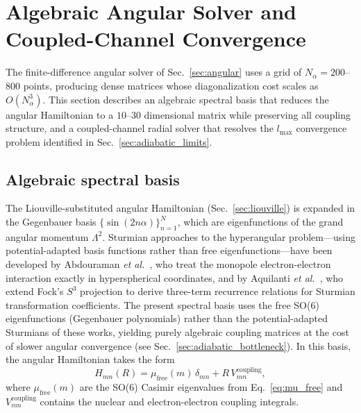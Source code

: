 \documentclass[aps,pra,twocolumn,superscriptaddress,longbibliography]{revtex4-2}
\begin{document}

\section{Algebraic Angular Solver and Coupled-Channel Convergence}
\label{sec:algebraic_angular}

The finite-difference angular solver of Sec.~\ref{sec:angular} uses
a grid of $N_\alpha = 200$--$800$ points, producing dense matrices
whose diagonalization cost scales as $O(N_\alpha^3)$.  This section
describes an algebraic spectral basis that reduces the angular
Hamiltonian to a $10$--$30$ dimensional matrix while preserving
all coupling structure, and a coupled-channel radial solver that
resolves the $l_{\max}$ convergence problem identified in
Sec.~\ref{sec:adiabatic_limits}.

\subsection{Algebraic spectral basis}
\label{sec:spectral_basis}

The Liouville-substituted angular Hamiltonian (Sec.~\ref{sec:liouville})
is expanded in the Gegenbauer basis $\{\sin(2n\alpha)\}_{n=1}^{N}$,
which are eigenfunctions of the grand angular momentum $\Lambda^2$.
Sturmian approaches to the hyperangular problem---using
potential-adapted basis functions rather than free eigenfunctions---have
been developed by Abdouraman \textit{et al.}~\cite{Abdouraman2016},
who treat the monopole electron-electron interaction exactly in
hyperspherical coordinates, and by Aquilanti \textit{et al.}~\cite{Aquilanti2001},
who extend Fock's $S^3$ projection to derive three-term recurrence
relations for Sturmian transformation coefficients.  The present
spectral basis uses the free SO(6) eigenfunctions (Gegenbauer
polynomials) rather than the potential-adapted Sturmians of these
works, yielding purely algebraic coupling matrices at the cost of
slower angular convergence (see Sec.~\ref{sec:adiabatic_bottleneck}).
In this basis, the angular Hamiltonian takes the form
\begin{equation}
  H_{mn}(R) = \mu_{\mathrm{free}}(m)\,\delta_{mn}
  + R\,V^{\mathrm{coupling}}_{mn},
  \label{eq:H_spectral}
\end{equation}
where $\mu_{\mathrm{free}}(m)$ are the SO(6) Casimir eigenvalues
from Eq.~\eqref{eq:mu_free} and $V^{\mathrm{coupling}}_{mn}$ contains
the nuclear and electron-electron coupling integrals.
\end{document}
